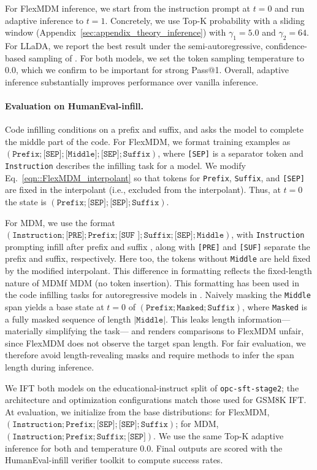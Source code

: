 For FlexMDM inference, we start from the instruction prompt at $t=0$ and run adaptive inference to $t=1$. Concretely, we use Top-K probability with a sliding window (Appendix~\ref{sec:appendix_theory_inference}) with $\gamma_1=5.0$ and $\gamma_2=64$. For LLaDA, we report the best result under the semi-autoregressive, confidence-based sampling of \citep{nie2025large}. For both models, we set the token sampling temperature to $0.0$, which we confirm to be important for strong Pass@1. Overall, adaptive inference substantially improves performance over vanilla inference.

\paragraph{Evaluation on HumanEval-infill.}
Code infilling conditions on a prefix and suffix, and asks the model to complete the middle part of the code. For FlexMDM, we format training examples as
$(\texttt{Prefix};\texttt{[SEP]};\texttt{[Middle]};\texttt{[SEP]};\texttt{Suffix})$,
where \texttt{[SEP]} is a separator token and \texttt{Instruction} describes the infilling task for a model. We modify Eq.~\eqref{eqn::FlexMDM_interpolant} so that tokens for \texttt{Prefix}, \texttt{Suffix}, and \texttt{[SEP]} are fixed in the interpolant (i.e., excluded from the interpolant). Thus, at $t=0$ the state is
$(\texttt{Prefix};\texttt{[SEP]};\texttt{[SEP]};\texttt{Suffix})$.

For MDM, we use the format
$(\texttt{Instruction};\texttt{[PRE]};\texttt{Prefix};\texttt{[SUF ]};\texttt{Suffix};\texttt{[SEP]};\texttt{Middle})$,
with \texttt{Instruction} prompting infill after prefix and suffix
, along with \texttt{[PRE]} and \texttt{[SUF]} separate the prefix and suffix, respectively. Here too, the tokens without \texttt{Middle} are held fixed by the modified interpolant. This difference in formatting reflects the fixed-length nature of MDMf MDM (no token insertion). This formatting has been used in the code infilling tasks for autoregressive models in \cite{bavarian2022efficient}. Naively masking the \texttt{Middle} span yields a base state at $t=0$ of $(\texttt{Prefix};\texttt{Masked};\texttt{Suffix})$, where \texttt{Masked} is a fully masked sequence of length $|\texttt{Middle}|$. This leaks length information—materially simplifying the task— and renders comparisons to FlexMDM unfair, since FlexMDM does not observe the target span length. For fair evaluation, we therefore avoid length-revealing masks and require methods to infer the span length during inference.

We IFT both models on the educational-instruct split of \texttt{opc-sft-stage2}; the architecture and optimization configurations match those used for GSM8K IFT. At evaluation, we initialize from the base distributions: for FlexMDM,
$(\texttt{Instruction};\texttt{Prefix};\texttt{[SEP]};\texttt{[SEP]};\texttt{Suffix})$;
for MDM,
$(\texttt{Instruction};\texttt{Prefix};\texttt{Suffix};\texttt{[SEP]})$.
We use the same Top-K adaptive inference for both and temperature $0.0$. Final outputs are scored with the HumanEval-infill verifier toolkit to compute success rates.